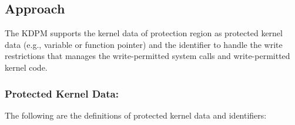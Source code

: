 \subsection{Approach}

The KDPM supports the kernel data of protection region as protected kernel data
(e.g., variable or function pointer) and the identifier to handle the write
restrictions that manages the write-permitted system calls and write-permitted
kernel code.
%
%

\subsubsection{Protected Kernel Data:}

The following are the definitions of protected kernel data and identifiers:



